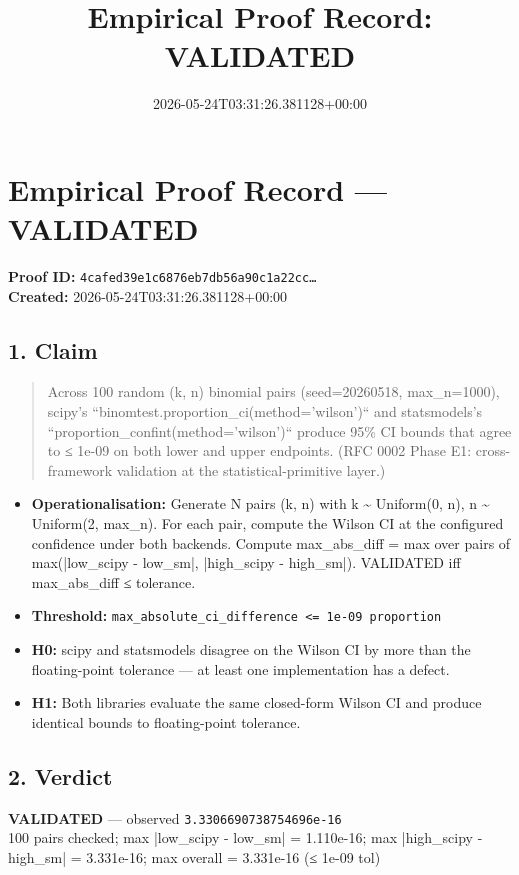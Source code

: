 \documentclass{article}
\title{Empirical Proof Record: VALIDATED}
\date{2026-05-24T03:31:26.381128+00:00}
\begin{document}
\maketitle
\section*{Empirical Proof Record --- \textcolor{validated}{\textbf{VALIDATED}}}
\textbf{Proof ID:} \texttt{4cafed39e1c6876eb7db56a90c1a22cc\dots}\\
\textbf{Created:} 2026-05-24T03:31:26.381128+00:00
\subsection*{1. Claim}
\begin{quote}Across 100 random (k, n) binomial pairs (seed=20260518, max\_n=1000), scipy's ``binomtest.proportion\_ci(method='wilson')`` and statsmodels's ``proportion\_confint(method='wilson')`` produce 95\% CI bounds that agree to ≤ 1e-09 on both lower and upper endpoints. (RFC 0002 Phase E1: cross-framework validation at the statistical-primitive layer.)\end{quote}
\begin{itemize}
\item \textbf{Operationalisation:} Generate N pairs (k, n) with k \textasciitilde{} Uniform(0, n), n \textasciitilde{} Uniform(2, max\_n). For each pair, compute the Wilson CI at the configured confidence under both backends. Compute max\_abs\_diff = max over pairs of max(|low\_scipy - low\_sm|, |high\_scipy - high\_sm|). VALIDATED iff max\_abs\_diff ≤ tolerance.
\item \textbf{Threshold:} \texttt{max\_absolute\_ci\_difference <= 1e-09 proportion}
\item \textbf{H0:} scipy and statsmodels disagree on the Wilson CI by more than the floating-point tolerance — at least one implementation has a defect.
\item \textbf{H1:} Both libraries evaluate the same closed-form Wilson CI and produce identical bounds to floating-point tolerance.
\end{itemize}
\subsection*{2. Verdict}
\textcolor{validated}{\textbf{VALIDATED}} --- observed \texttt{3.3306690738754696e-16}\\
100 pairs checked; max |low\_scipy - low\_sm| = 1.110e-16; max |high\_scipy - high\_sm| = 3.331e-16; max overall = 3.331e-16 (≤ 1e-09 tol)
\end{document}
